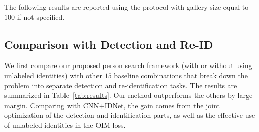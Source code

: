 The following results are reported using the protocol with gallery size equal to $100$ if not specified.

\subsection{Comparison with Detection and Re-ID} %
\label{sub:comparison_with_detection_and_re_id}
We first compare our proposed person search framework (with or without using unlabeled identities) with other $15$ baseline combinations that break down the problem into separate detection and re-identification tasks. The results are summarized in Table~\ref{tab:results}. Our method outperforms the others by large margin. Comparing with CNN+IDNet, the gain comes from the joint optimization of the detection and identification parts, as well as the effective use of unlabeled identities in the OIM loss.


